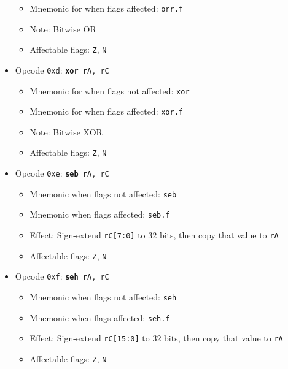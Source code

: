 \documentclass{article}
\begin{document}
\begin{itemize}
\begin{itemize}
			\item Mnemonic for when flags affected:  \texttt{orr.f}
			\item Note:  Bitwise OR
			\item Affectable flags:
				\texttt{Z}, \texttt{N}
		\end{itemize}
		\item Opcode \texttt{0xd}:
			\texttt{\textbf{xor} rA, rC}
		\begin{itemize}
			\item Mnemonic for when flags not affected:  \texttt{xor}
			\item Mnemonic for when flags affected:  \texttt{xor.f}
			\item Note:  Bitwise XOR
			\item Affectable flags:
				\texttt{Z}, \texttt{N}
		\end{itemize}
		\item Opcode \texttt{0xe}:
			\texttt{\textbf{seb} rA, rC}
		\begin{itemize}
			\item Mnemonic when flags not affected:  \texttt{seb}
			\item Mnemonic when flags affected:  \texttt{seb.f}
			\item Effect:
				Sign-extend \texttt{rC[7:0]} to 32 bits, then copy that
				value to \texttt{rA}
			\item Affectable flags:
				\texttt{Z}, \texttt{N}
		\end{itemize}
		\item Opcode \texttt{0xf}:
			\texttt{\textbf{seh} rA, rC}
		\begin{itemize}
			\item Mnemonic when flags not affected:  \texttt{seh}
			\item Mnemonic when flags affected:  \texttt{seh.f}
			\item Effect:
				Sign-extend \texttt{rC[15:0]} to 32 bits, then copy that
				value to \texttt{rA}
			\item Affectable flags:
				\texttt{Z}, \texttt{N}
		\end{itemize}

\end{itemize}
\end{document}

